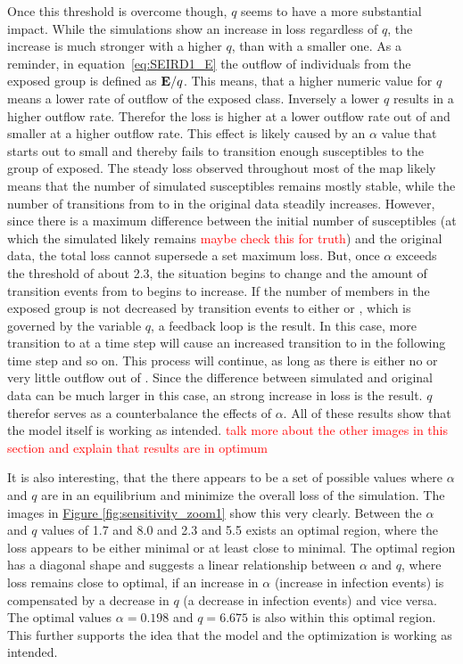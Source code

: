 Once this threshold is overcome though, $q$ seems to have a more substantial impact. While the simulations show
an increase in loss regardless of $q$, the increase is much stronger with a higher $q$, than with a smaller one.
As a reminder, in equation~\ref*{eq:SEIRD1_E} the outflow of individuals from the exposed group is defined as $\text{\textbf{E}}/q$.
This means, that a higher numeric value for $q$ means a lower rate of outflow of the exposed class. Inversely a lower $q$ results
in a higher outflow rate. Therefor the loss is higher at a lower outflow rate out of  and smaller at a higher outflow rate.
This effect is likely caused by an $\alpha$ value that starts out to small and thereby fails to transition enough susceptibles
to the group of exposed. The steady loss observed throughout most of the map likely means that the number of simulated susceptibles
remains mostly stable, while the number of transitions from  to  in the original data steadily increases. However, since 
there is a maximum difference between the initial number of susceptibles (at which the simulated likely remains
\textcolor{red}{maybe check this for truth}) and the original data, the total loss cannot supersede a set maximum loss.
But, once $\alpha$ exceeds the threshold of about 2.3, the situation begins to change and the amount of transition events from
 to  begins to increase. If the number of members in the exposed group is not decreased by transition events to either
 or , which is governed by the variable $q$, a feedback loop is the result. In this case, more transition to  at a time
step will cause an increased transition to  in the following time step and so on. This process will continue, as long as there is
either no or very little outflow out of . Since the difference between simulated and original data can be much larger in this case,
an strong increase in loss is the result. $q$ therefor serves as a counterbalance the effects of $\alpha$. All of these results show
that the model itself is working as intended.
\textcolor{red}{talk more about the other images in this section and explain that results are in optimum}
\newline 

 It is also interesting, that the there appears to be a set of possible values where $\alpha$ and $q$ are in an equilibrium and 
 minimize the overall loss of the simulation. The images in \hyperref[fig:sensitivity_zoom1]{Figure \ref*{fig:sensitivity_zoom1}}
 show this very clearly. Between the $\alpha$ and $q$ values of 1.7 and 8.0 and 2.3 and 5.5 exists an optimal region, where the
 loss appears to be either minimal or at least close to minimal. The optimal region has a diagonal shape and suggests a linear
 relationship between $\alpha$ and $q$, where loss remains close to optimal, if an increase in $\alpha$ (increase in infection events)
 is compensated by a decrease in $q$ (a decrease in infection events) and vice versa. The optimal values $\alpha = 0.198$ and
 $q = 6.675$ is also within this optimal region. This further supports the idea that the model and the optimization is working as
 intended.

